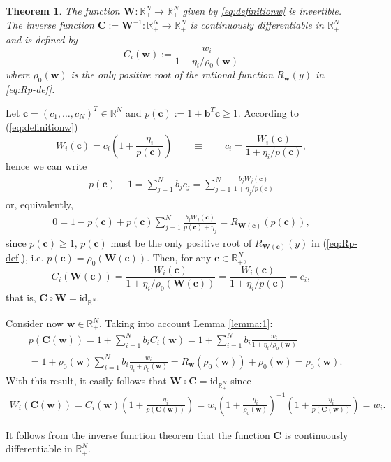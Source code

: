 \documentclass[preprint]{elsarticle}
\newtheorem{theorem}{Theorem}[section]
\theoremstyle{definition}
\newcommand{\bbc}{{\boldsymbol c}}
\newcommand{\bbw}{{\boldsymbol w}}
\def\rpn{\mathbb{R}_+^N}
\newcommand{\bw}{\boldsymbol w}
\newcommand{\bW}{\boldsymbol W}
\newcommand{\bc}{\boldsymbol c}
\newcommand{\bC}{\boldsymbol C}
\newcommand{\bb}{\boldsymbol b}
\begin{document}
\begin{theorem}\label{th:winvertible}
The function ${\boldsymbol W}:
\rpn \rightarrow \rpn$ given by
  \eqref{eq:definitionw} is invertible. The  inverse function $\bC:=\bW^{-1}\colon \rpn \rightarrow \rpn$ is   continuously differentiable in $\rpn$ and is
defined by
\begin{equation} \label{eq:cw-def}
 C_i(\bw) := \frac{w_i}{1+{\eta_i}/{\rho_0(\bbw)}} 
\end{equation}
where $\rho_0(\bbw)$ is the only positive root of the rational function
$R_{\bw}(y)$ in \eqref{eq:Rp-def}.

\end{theorem}
\begin{pf}


Let $\bc=(c_1,\ldots,c_N)^T\in \rpn$ and
$p(\bbc):=1+\bb^T\bbc\geq1$. According to (\ref{eq:definitionw})\[ W_i(\bbc)=c_i \left(1+\frac{\eta_i}{p(\bbc)}\right) \qquad \equiv \qquad c_i=
\frac{W_i(\bc)}{1+\eta_i/p(\bbc)}, \]
hence we can write
\begin{align*}
  p(\bbc)-1=\sum_{j=1}^N b_j c_j = 
\sum_{j=1}^N \frac{ b_j  W_j(\bc)}{1+\eta_j/p(\bbc)}\end{align*}
or, equivalently,
\begin{align*}
0=1-p(\bbc)+p(\bbc)\sum_{j=1}^N \frac{ b_j
  W_j(\bc)}{p(\bbc)+\eta_j}=R_{\bW(\bc)} (p(\bc)),
\end{align*}
since $p(\bc)\geq1$,  $p(\bc)$ must be the only positive root of $R_{\bW(\bc)}(y)$ in
(\ref{eq:Rp-def}), i.e. $p(\bc)=\rho_0(\bW(\bc))$. 
Then, for any $\bc \in \rpn$, 
\[C_i(\bW(\bc))=\frac{W_i(\bc)}{1+{\eta_i}/{\rho_0(\bW(\bc))}}=
\frac{W_i(\bc)}{1+{\eta_i}/{p(\bc)}}=c_i,
\]
that is, $\bC\circ \bW= \text{id}_{\mathbb R_+^N}$.

Consider now $\bw\in\mathbb R_+^N$. Taking into account Lemma \ref{lemma:1}:
\begin{align*}
  &p(\bC(\bw))=1+\sum_{i=1}^{N} b_i C_i(\bw)=1+\sum_{i=1}^{N} b_i
  \frac{w_i}{1+\eta_i/\rho_0(\bw)} \\
  &=1+\rho_0(\bw)\sum_{i=1}^{N} b_i
  \frac{w_i}{\eta_i+\rho_0(\bw)} =
  R_{\bw}(\rho_0(\bw))+\rho_0(\bw)=\rho_0(\bw).
\end{align*}
With this result, it easily follows that $\bW\circ \bC=
\text{id}_{\mathbb R_+^N}$  since
\begin{align*}
  W_i(\bC(\bw))=C_i(\bw)\left(1+\frac{\eta_i}{p(\bC(\bw))}\right)=
  w_i\left(1+\frac{\eta_i}{\rho_0(\bw)}\right)^{-1}\left(1+\frac{\eta_i}{p(\bC(\bw))}\right)=w_i.
\end{align*}  

It follows from the inverse function theorem that the function $\bC$
is continuously differentiable in  $\rpn$.
\end{pf}
\end{document}

